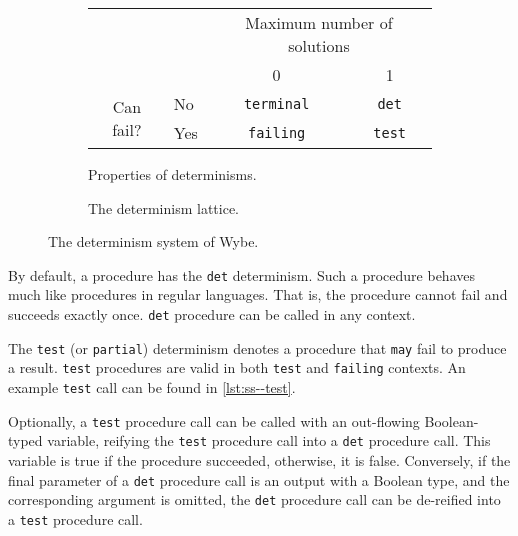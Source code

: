 \begin{figure}[ht]
  \centering
  \begin{subfigure}[htb]{0.49\textwidth}
    \centering 
    \begin{tabular}{cl|cc}
        & & \multicolumn{2}{c}{Maximum number of solutions} \\
        & & 0 & 1 \\
      \hline
      \multirow{2}{*}{Can fail?}
        & No  & \texttt{terminal} & \texttt{det}  \\
        & Yes & \texttt{failing}  & \texttt{test} \\
    \end{tabular}
    \vfill
    \caption{Properties of determinisms.}
    \label{sfig:detism-table}
  \end{subfigure}\hfill
  \begin{subfigure}[htb]{0.49\textwidth}
    \centering
    \caption{The determinism lattice.}
    \label{sfig:detism-lattice}
  \end{subfigure}
  \caption{The determinism system of Wybe.}
  \label{fig:intro-detism}
\end{figure}

By default, a procedure has the \texttt{det} determinism. Such a procedure behaves much like procedures in regular languages. That is, the procedure cannot fail and succeeds exactly once. \texttt{det} procedure can be called in any context.

The \texttt{test} (or \texttt{partial}) determinism denotes a procedure that \texttt{may} fail to produce a result. \texttt{test} procedures are valid in both \texttt{test} and \texttt{failing} contexts. An example \texttt{test} call can be found in \cref{lst:ss--test}.

Optionally, a \texttt{test} procedure call can be called with an out-flowing Boolean-typed variable, reifying the \texttt{test} procedure call into a \texttt{det} procedure call. This variable is true if the procedure succeeded, otherwise, it is false. Conversely, if the final parameter of a \texttt{det} procedure call is an output with a Boolean type, and the corresponding argument is omitted, the \texttt{det} procedure call can be de-reified into a \texttt{test} procedure call. 


